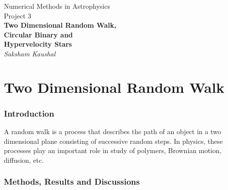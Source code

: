 \documentclass[a4paper]{article}
\begin{document}
	
	
	\begin{titlepage}
		\begin{center}
			\Large Numerical Methods in Astrophysics \\
			\vspace{1cm}
			\huge{
				Project 3 \\
				\vspace{0.5cm}
				\textbf{Two Dimensional Random Walk,}\\
				\textbf{Circular Binary and} \\
				\textbf{Hypervelocity Stars} \\
				\vspace{1cm}
			}
			\Large \emph{Saksham Kaushal}
		\end{center}
	\end{titlepage}
	
	
	\tableofcontents
	\newpage
	
	
	\part{Two Dimensional Random Walk} \label{problem1}
	
		
		\section{Introduction} \label{1:introduction}
		
		A random walk is a process that describes the path of an object in a two dimensional plane consisting of successive random steps. In physics, these processes play an important role in study of polymers, Brownian motion, diffusion, etc. 
		
		
		\section{Methods, Results and Discussions} \label{1:methods_results}
		
\end{document}
